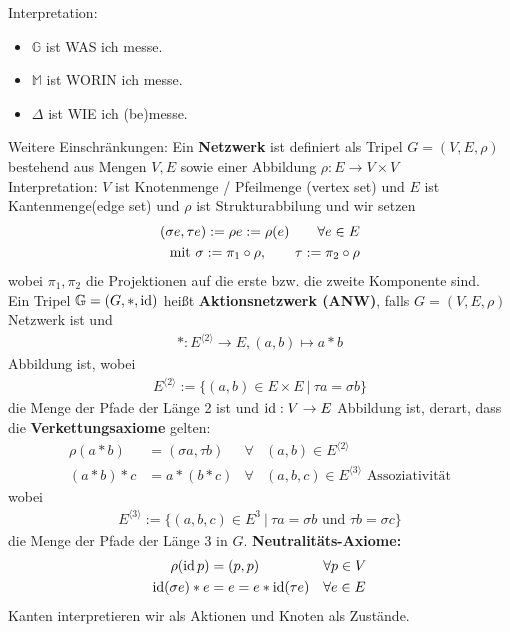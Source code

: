 Interpretation:
\begin{itemize}
\item $\mathbb{G}$ ist WAS ich messe.
\item $\mathbb{M}$ ist WORIN ich messe.
\item $\Delta$ ist WIE ich (be)messe.
\end{itemize}
Weitere Einschränkungen: Ein \textbf{Netzwerk} ist definiert als Tripel $G=(V,E,\rho)$ bestehend aus Mengen $V,E$ sowie einer Abbildung $\rho:E\to V\times V$\\
Interpretation: $V$ ist Knotenmenge / Pfeilmenge (vertex set) und $E$ ist Kantenmenge(edge set) und $\rho$ ist Strukturabbilung und wir setzen
\begin{align*}
(\sigma e,\tau e):=\rho e:=\rho(e)\qquad\forall e\in E\\
\mit\sigma:=\pi_1\circ\rho,\qquad\tau:=\pi_2\circ\rho
\end{align*}
wobei $\pi_1,\pi_2$ die Projektionen auf die erste bzw. die zweite Komponente sind.\\
Ein Tripel $\mathbb{G}=(G,\ast,\id)$ heißt \textbf{Aktionsnetzwerk (ANW)}, falls $G=(V,E,\rho)$ Netzwerk ist und 
\begin{align*}
\ast:E^{\langle 2\rangle}\to E, (a,b)\mapsto a\ast b
\end{align*}
Abbildung ist, wobei
\begin{align*}
E^{\langle 2\rangle}:=\big\lbrace (a,b)\in E\times E~\big|~\tau a =\sigma b\big\rbrace
\end{align*}
die Menge der Pfade der Länge 2 ist und $\id:V\to E$ Abbildung ist, derart, dass die \textbf{Verkettungsaxiome} gelten:
\begin{align*}
\rho(a\ast b)&=(\sigma a,\tau b) &\forall& (a,b)\in E^{\langle 2\rangle}\\
(a\ast b)\ast c&=a\ast(b\ast c) &\forall& (a,b,c)\in E^{\langle 3\rangle}\text{ Assoziativität}
\end{align*}
wobei 
\begin{align*}
E^{\langle 3\rangle}:=\big\lbrace(a,b,c)\in E^3~\big|~\tau a=\sigma b\text{ und }\tau b=\sigma c\big\rbrace
\end{align*}
die Menge der Pfade der Länge 3 in $G$.
\textbf{Neutralitäts-Axiome:}
\begin{align*}
\rho (\id p)&=(p,p) &\forall& p\in V\\
\id(\sigma e)\ast e&=e=e\ast\id(\tau e) &\forall& e\in E
\end{align*}
Kanten interpretieren wir als Aktionen und Knoten als Zustände.

